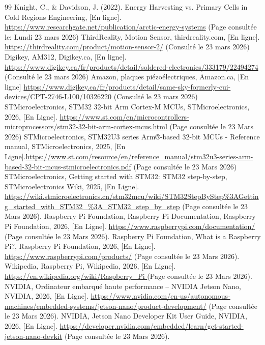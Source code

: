 \begin{thebibliographyUL}{99}
     Knight, C., \& Davidson, J. (2022). Energy Harvesting vs. Primary Cells in Cold Regions Engineering, [En ligne]. \url{https://www.researchgate.net/publication/arctic-energy-systems} (Page consultée le: Lundi 23 mars 2026)
     ThirdReality, Motion Sensor, thirdreality.com, [En ligne]. \url{https://thirdreality.com/product/motion-sensor-2/} (Consulté le 23 mars 2026)
     Digikey, AM312, Digikey.ca, [En ligne]. \url{https://www.digikey.ca/fr/products/detail/soldered-electronics/333179/22494274} (Consulté le 23 mars 2026)
     Amazon, plaques piézoélectriques, Amazon.ca, [En ligne]
    \url{https://www.digikey.ca/fr/products/detail/same-sky-formerly-cui-devices/CPT-2746-L100/10326220} (Consulté le 23 mars 2026)
     STMicroelectronics, STM32 32-bit Arm Cortex-M MCUs, STMicroelectronics, 2026, [En Ligne].  \url{https://www.st.com/en/microcontrollers-microprocessors/stm32-32-bit-arm-cortex-mcus.html} (Page consultée le 23 Mars 2026)
     STMicroelectronics, STM32U3 series Arm®-based 32-bit MCUs - Reference manual, STMicroelectronics, 2025, [En Ligne].\url{https://www.st.com/resource/en/reference_manual/stm32u3-series-arm-based-32-bit-mcus-stmicroelectronics.pdf} (Page consultée le 23 Mars 2026)
     STMicroelectronics, Getting started with STM32: STM32 step-by-step, STMicroelectronics Wiki, 2025, [En Ligne]. \url{https://wiki.stmicroelectronics.cn/stm32mcu/wiki/STM32StepByStep%3AGetting_started_with_STM32_%3A_STM32_step_by_step} (Page consultée le 23 Mars 2026).
     Raspberry Pi Foundation, Raspberry Pi Documentation, Raspberry Pi Foundation, 2026, [En Ligne]. \url{https://www.raspberrypi.com/documentation/} (Page consultée le 23 Mars 2026).
     Raspberry Pi Foundation, What is a Raspberry Pi?, Raspberry Pi Foundation, 2026, [En Ligne]. \url{https://www.raspberrypi.com/products/} (Page consultée le 23 Mars 2026).
     Wikipedia, Raspberry Pi, Wikipedia, 2026, [En Ligne]. \url{https://en.wikipedia.org/wiki/Raspberry_Pi } (Page consultée le 23 Mars 2026).
     NVIDIA, Ordinateur embarqué haute performance – NVIDIA Jetson Nano, NVIDIA, 2026, [En Ligne]. \url{https://www.nvidia.com/en-us/autonomous-machines/embedded-systems/jetson-nano/product-development/} (Page consultée le 23 Mars 2026).
     NVIDIA, Jetson Nano Developer Kit User Guide, NVIDIA, 2026, [En Ligne]. \url{https://developer.nvidia.com/embedded/learn/get-started-jetson-nano-devkit} (Page consultée le 23 Mars 2026).

\end{thebibliographyUL}
